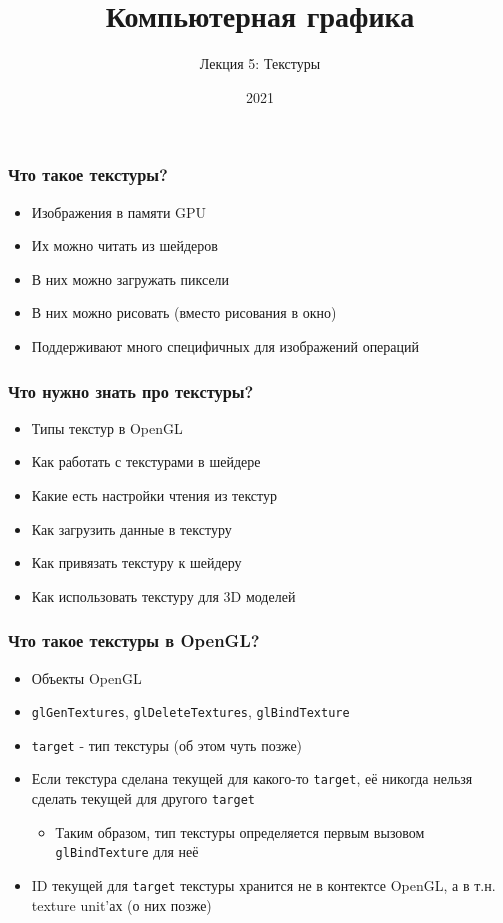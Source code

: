 \documentclass{beamer}
\title{Компьютерная графика}
\subtitle{Лекция 5: Текстуры}
\date{2021}
\begin{document}
\frame{\titlepage}

\begin{frame}[fragile]
\frametitle{Что такое текстуры?}
\begin{itemize}
\item Изображения в памяти GPU
\pause
\item Их можно читать из шейдеров
\pause
\item В них можно загружать пиксели
\pause
\item В них можно рисовать (вместо рисования в окно)
\pause
\item Поддерживают много специфичных для изображений операций
\end{itemize}
\end{frame}

\begin{frame}[fragile]
\frametitle{Что нужно знать про текстуры?}
\begin{itemize}
\item Типы текстур в OpenGL
\pause
\item Как работать с текстурами в шейдере
\pause
\item Какие есть настройки чтения из текстур
\pause
\item Как загрузить данные в текстуру
\pause
\item Как привязать текстуру к шейдеру
\pause
\item Как использовать текстуру для 3D моделей
\end{itemize}
\end{frame}

\begin{frame}[fragile]
\frametitle{Что такое текстуры в OpenGL?}
\begin{itemize}
\item Объекты OpenGL
\pause
\item \verb|glGenTextures|, \verb|glDeleteTextures|, \verb|glBindTexture|
\pause
\item \verb|target| - тип текстуры (об этом чуть позже)
\pause
\item Если текстура сделана текущей для какого-то \verb|target|, её никогда нельзя сделать текущей для другого \verb|target|
\begin{itemize}
\item Таким образом, тип текстуры определяется первым вызовом \verb|glBindTexture| для неё
\end{itemize}
\pause
\item ID текущей для \verb|target| текстуры хранится не в контектсе OpenGL, а в т.н. texture unit'ах (о них позже)
\end{itemize}
\end{frame}
\end{document}
